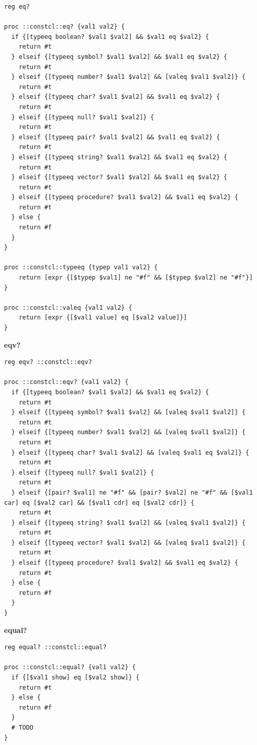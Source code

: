 \documentclass[twoside,9pt]{report}
\begin{document}
\noindent\makebox[\linewidth]{\rule{\linewidth}{0.4pt}}
\begin{lstlisting}
reg eq?
 
proc ::constcl::eq? {val1 val2} {
  if {[typeeq boolean? $val1 $val2] && $val1 eq $val2} {
    return #t
  } elseif {[typeeq symbol? $val1 $val2] && $val1 eq $val2} {
    return #t
  } elseif {[typeeq number? $val1 $val2] && [valeq $val1 $val2]} {
    return #t
  } elseif {[typeeq char? $val1 $val2] && $val1 eq $val2} {
    return #t
  } elseif {[typeeq null? $val1 $val2]} {
    return #t
  } elseif {[typeeq pair? $val1 $val2] && $val1 eq $val2} {
    return #t
  } elseif {[typeeq string? $val1 $val2] && $val1 eq $val2} {
    return #t
  } elseif {[typeeq vector? $val1 $val2] && $val1 eq $val2} {
    return #t
  } elseif {[typeeq procedure? $val1 $val2] && $val1 eq $val2} {
    return #t
  } else {
    return #f
  }
}
 
proc ::constcl::typeeq {typep val1 val2} {
    return [expr {[$typep $val1] ne "#f" && [$typep $val2] ne "#f"}]
}
 
proc ::constcl::valeq {val1 val2} {
    return [expr {[$val1 value] eq [$val2 value]}]
}
\end{lstlisting}
\noindent\makebox[\linewidth]{\rule{\linewidth}{0.4pt}}

\textbf{eqv?}

\noindent\makebox[\linewidth]{\rule{\linewidth}{0.4pt}}
\begin{lstlisting}
reg eqv? ::constcl::eqv?
 
proc ::constcl::eqv? {val1 val2} {
  if {[typeeq boolean? $val1 $val2] && $val1 eq $val2} {
    return #t
  } elseif {[typeeq symbol? $val1 $val2] && [valeq $val1 $val2]} {
    return #t
  } elseif {[typeeq number? $val1 $val2] && [valeq $val1 $val2]} {
    return #t
  } elseif {[typeeq char? $val1 $val2] && [valeq $val1 eq $val2]} {
    return #t
  } elseif {[typeeq null? $val1 $val2]} {
    return #t
  } elseif {[pair? $val1] ne "#f" && [pair? $val2] ne "#f" && [$val1 car] eq [$val2 car] && [$val1 cdr] eq [$val2 cdr]} {
    return #t
  } elseif {[typeeq string? $val1 $val2] && [valeq $val1 $val2]} {
    return #t
  } elseif {[typeeq vector? $val1 $val2] && [valeq $val1 $val2]} {
    return #t
  } elseif {[typeeq procedure? $val1 $val2] && $val1 eq $val2} {
    return #t
  } else {
    return #f
  }
}
\end{lstlisting}
\noindent\makebox[\linewidth]{\rule{\linewidth}{0.4pt}}

\textbf{equal?}

\noindent\makebox[\linewidth]{\rule{\linewidth}{0.4pt}}
\begin{lstlisting}
reg equal? ::constcl::equal?
 
proc ::constcl::equal? {val1 val2} {
  if {[$val1 show] eq [$val2 show]} {
    return #t
  } else {
    return #f
  }
  # TODO
}
\end{lstlisting}
\noindent\makebox[\linewidth]{\rule{\linewidth}{0.4pt}}
\end{document}
